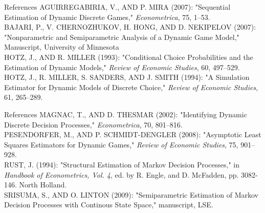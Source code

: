 \documentclass[aspectratio=169,11pt]{beamer}
\begin{document}
\begin{frame}{References}
AGUIRREGABIRIA, V., AND P. MIRA (2007): "Sequential Estimation of Dynamic Discrete Games," \emph{Econometrica}, 75, 1--53. \\
\vspace{2mm}
BAJARI, P., V. CHERNOZHUKOV, H. HONG, AND D. NEKIPELOV (2007): "Nonparametric and Semiparametric Analysis of a Dynamic Game Model," Manuscript, University of Minnesota \\
\vspace{2mm}
HOTZ, J., AND R. MILLER (1993): "Conditional Choice Probabilities and the Estimation of Dynamic Models," \emph{Review of Economic Studies}, 60, 497--529. \\
\vspace{2mm}
HOTZ, J., R. MILLER, S. SANDERS, AND J. SMITH (1994): "A Simulation Estimator for Dynamic Models of Discrete Choice," \emph{Review of Economic Studies}, 61, 265--289.\\
\end{frame}

\begin{frame}{References}
MAGNAC, T., AND D. THESMAR (2002): "Identifying Dynamic Discrete Decision Processes," \emph{Econometrica}, 70, 801--816.\\
\vspace{2mm}
PESENDORFER, M., AND P. SCHMIDT-DENGLER (2008): "Asymptotic Least Squares Estimators for Dynamic Games," \emph{Review of Economic Studies}, 75, 901--928. \\
\vspace{2mm}
RUST, J. (1994): "Structural Estimation of Markov Decision Processes," in \emph{Handbook of Econometrics, Vol. 4}, ed. by R. Engle, and D. McFadden, pp. 3082-146. North Holland.\\
\vspace{2mm}
SRISUMA, S., AND O. LINTON (2009): "Semiparametric Estimation of Markov Decision Processes with Continous State Space," manuscript, LSE. 
\end{frame}
\end{document}

